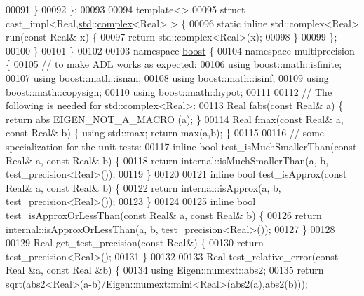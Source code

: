 \begin{DoxyCode}
00091       \}
00092     \};
00093 
00094     \textcolor{keyword}{template}<>
00095     \textcolor{keyword}{struct }cast\_impl<Real,\hyperlink{namespacestd}{std}::\hyperlink{structcomplex}{complex}<Real> > \{
00096       \textcolor{keyword}{static} \textcolor{keyword}{inline} std::complex<Real>  run(\textcolor{keyword}{const} Real& x) \{
00097         \textcolor{keywordflow}{return} std::complex<Real>(x);
00098       \}
00099     \};
00100   \}
00101 \}
00102 
00103 \textcolor{keyword}{namespace }\hyperlink{namespaceboost}{boost} \{
00104 \textcolor{keyword}{namespace }multiprecision \{
00105   \textcolor{comment}{// to make ADL works as expected:}
00106   \textcolor{keyword}{using} boost::math::isfinite;
00107   \textcolor{keyword}{using} boost::math::isnan;
00108   \textcolor{keyword}{using} boost::math::isinf;
00109   \textcolor{keyword}{using} boost::math::copysign;
00110   \textcolor{keyword}{using} boost::math::hypot;
00111 
00112   \textcolor{comment}{// The following is needed for std::complex<Real>:}
00113   Real fabs(\textcolor{keyword}{const} Real& a) \{ \textcolor{keywordflow}{return} abs EIGEN\_NOT\_A\_MACRO (a); \}
00114   Real fmax(\textcolor{keyword}{const} Real& a, \textcolor{keyword}{const} Real& b) \{ \textcolor{keyword}{using} std::max; \textcolor{keywordflow}{return} max(a,b); \}
00115 
00116   \textcolor{comment}{// some specialization for the unit tests:}
00117   \textcolor{keyword}{inline} \textcolor{keywordtype}{bool} test\_isMuchSmallerThan(\textcolor{keyword}{const} Real& a, \textcolor{keyword}{const} Real& b) \{
00118     \textcolor{keywordflow}{return} internal::isMuchSmallerThan(a, b, test\_precision<Real>());
00119   \}
00120 
00121   \textcolor{keyword}{inline} \textcolor{keywordtype}{bool} test\_isApprox(\textcolor{keyword}{const} Real& a, \textcolor{keyword}{const} Real& b) \{
00122     \textcolor{keywordflow}{return} internal::isApprox(a, b, test\_precision<Real>());
00123   \}
00124 
00125   \textcolor{keyword}{inline} \textcolor{keywordtype}{bool} test\_isApproxOrLessThan(\textcolor{keyword}{const} Real& a, \textcolor{keyword}{const} Real& b) \{
00126     \textcolor{keywordflow}{return} internal::isApproxOrLessThan(a, b, test\_precision<Real>());
00127   \}
00128 
00129   Real get\_test\_precision(\textcolor{keyword}{const} Real&) \{
00130     \textcolor{keywordflow}{return} test\_precision<Real>();
00131   \}
00132 
00133   Real test\_relative\_error(\textcolor{keyword}{const} Real &a, \textcolor{keyword}{const} Real &b) \{
00134     \textcolor{keyword}{using} Eigen::numext::abs2;
00135     \textcolor{keywordflow}{return} sqrt(abs2<Real>(a-b)/Eigen::numext::mini<Real>(abs2(a),abs2(b)));

\end{DoxyCode}
